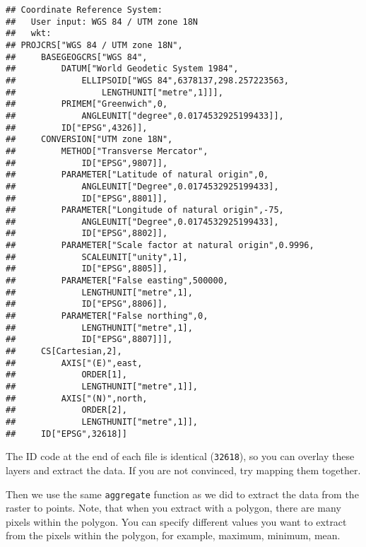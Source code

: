 \documentclass[
]{book}
\newenvironment{Shaded}{\begin{snugshade}}{\end{snugshade}}
\newcommand{\AttributeTok}[1]{\textcolor[rgb]{0.77,0.63,0.00}{#1}}
\newcommand{\ConstantTok}[1]{\textcolor[rgb]{0.00,0.00,0.00}{#1}}
\newcommand{\FunctionTok}[1]{\textcolor[rgb]{0.00,0.00,0.00}{#1}}
\newcommand{\NormalTok}[1]{#1}
\newcommand{\OtherTok}[1]{\textcolor[rgb]{0.56,0.35,0.01}{#1}}
\newcommand{\SpecialCharTok}[1]{\textcolor[rgb]{0.00,0.00,0.00}{#1}}
\begin{document}
\begin{verbatim}
## Coordinate Reference System:
##   User input: WGS 84 / UTM zone 18N 
##   wkt:
## PROJCRS["WGS 84 / UTM zone 18N",
##     BASEGEOGCRS["WGS 84",
##         DATUM["World Geodetic System 1984",
##             ELLIPSOID["WGS 84",6378137,298.257223563,
##                 LENGTHUNIT["metre",1]]],
##         PRIMEM["Greenwich",0,
##             ANGLEUNIT["degree",0.0174532925199433]],
##         ID["EPSG",4326]],
##     CONVERSION["UTM zone 18N",
##         METHOD["Transverse Mercator",
##             ID["EPSG",9807]],
##         PARAMETER["Latitude of natural origin",0,
##             ANGLEUNIT["Degree",0.0174532925199433],
##             ID["EPSG",8801]],
##         PARAMETER["Longitude of natural origin",-75,
##             ANGLEUNIT["Degree",0.0174532925199433],
##             ID["EPSG",8802]],
##         PARAMETER["Scale factor at natural origin",0.9996,
##             SCALEUNIT["unity",1],
##             ID["EPSG",8805]],
##         PARAMETER["False easting",500000,
##             LENGTHUNIT["metre",1],
##             ID["EPSG",8806]],
##         PARAMETER["False northing",0,
##             LENGTHUNIT["metre",1],
##             ID["EPSG",8807]]],
##     CS[Cartesian,2],
##         AXIS["(E)",east,
##             ORDER[1],
##             LENGTHUNIT["metre",1]],
##         AXIS["(N)",north,
##             ORDER[2],
##             LENGTHUNIT["metre",1]],
##     ID["EPSG",32618]]
\end{verbatim}

The ID code at the end of each file is identical (\texttt{32618}), so you can overlay these layers and extract the data. If you are not convinced, try mapping them together.

Then we use the same \texttt{aggregate} function as we did to extract the data from the raster to points. Note, that when you extract with a polygon, there are many pixels within the polygon. You can specify different values you want to extract from the pixels within the polygon, for example, maximum, minimum, mean.

\begin{Shaded}
\end{Shaded}
\end{document}
